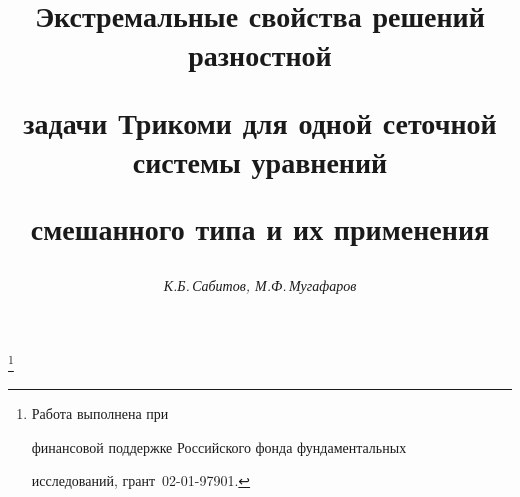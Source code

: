 









\newcommand{\const}{\operatorname{const}}


\newcommand{\sgn}{\operatorname{sgn}}


\newcommand{\tts}[1]{}


\renewcommand{\baselinestretch}{0.98}







\setcounter{page}{56}















\author{\it К.Б.\,Сабитов, М.Ф.\,Мугафаров}




\title{Экстремальные свойства решений разностной


задачи Трикоми для одной сеточной системы уравнений


смешанного типа и их применения}


\thanks{Работа выполнена при


финансовой поддержке Российского фонда фундаментальных


исследований, грант \No\,02-01-97901.}





\date{}




\pagestyle{plain} %





